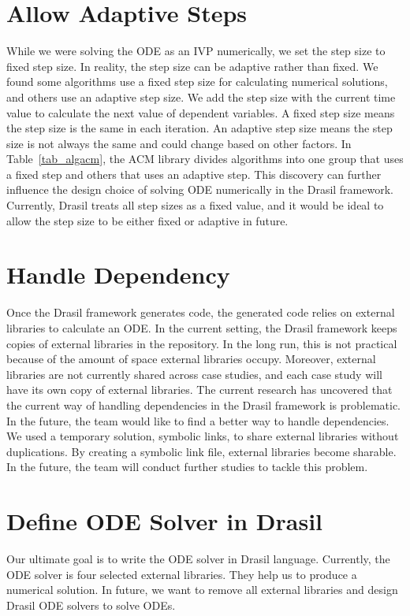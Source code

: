 \section{Allow Adaptive Steps}
While we were solving the ODE as an IVP numerically, we set the step size to fixed step size. In reality, the step size can be adaptive rather than fixed. We found some algorithms use a fixed step size for calculating numerical solutions, and others use an adaptive step size. We add the step size with the current time value to calculate the next value of dependent variables. A fixed step size means the step size is the same in each iteration. An adaptive step size means the step size is not always the same and could change based on other factors. In Table~\ref{tab_algacm}, the ACM library divides algorithms into one group that uses a fixed step and others that uses an adaptive step. This discovery can further influence the design choice of solving ODE numerically in the Drasil framework. Currently, Drasil treats all step sizes as a fixed value, and it would be ideal to allow the step size to be either fixed or adaptive in future.

\section{Handle Dependency}
Once the Drasil framework generates code, the generated code relies on external libraries to calculate an ODE. In the current setting, the Drasil framework keeps copies of external libraries in the repository. In the long run, this is not practical because of the amount of space external libraries occupy. Moreover, external libraries are not currently shared across case studies, and each case study will have its own copy of external libraries. The current research has uncovered that the current way of handling dependencies in the Drasil framework is problematic. In the future, the team would like to find a better way to handle dependencies. We used a temporary solution, symbolic links, to share external libraries without duplications. By creating a symbolic link file, external libraries become sharable. In the future, the team will conduct further studies to tackle this problem.

\section{Define ODE Solver in Drasil}
Our ultimate goal is to write the ODE solver in Drasil language. Currently, the ODE solver is four selected external libraries. They help us to produce a numerical solution. In future, we want to remove all external libraries and design Drasil ODE solvers to solve ODEs. 

